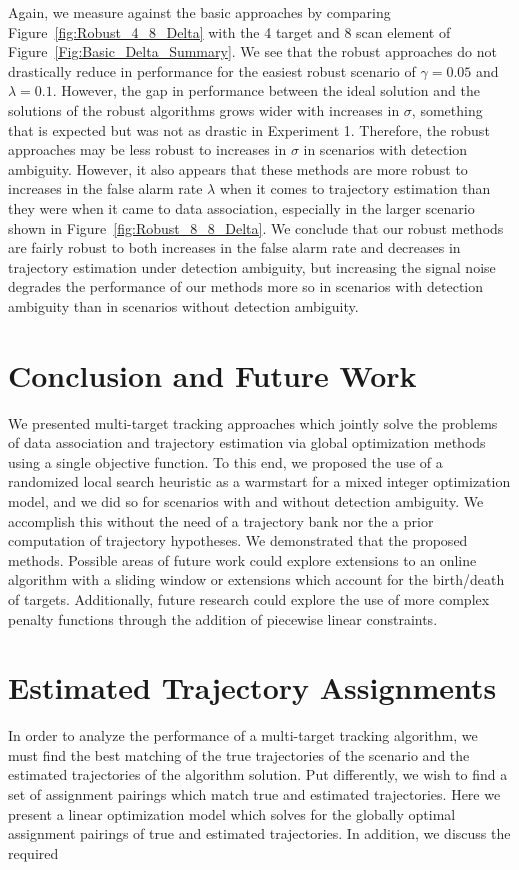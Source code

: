 \documentclass[journal]{IEEEtran}
\begin{document}
Again, we measure against the basic approaches by comparing Figure~\ref{fig:Robust_4_8_Delta} with the 4 target and 8 scan element of Figure~\ref{Fig:Basic_Delta_Summary}. We see that the robust approaches do not drastically reduce in performance for the easiest robust scenario of $\gamma = 0.05$ and $\lambda = 0.1$. However, the gap in performance between the ideal solution and the solutions of the robust algorithms grows wider with increases in $\sigma$, something that is expected but was not as drastic in Experiment 1. Therefore, the robust approaches may be less robust to increases in $\sigma$ in scenarios with detection ambiguity. However, it also appears that these methods are more robust to increases in the false alarm rate $\lambda$ when it comes to trajectory estimation than they were when it came to data association, especially in the larger scenario shown in Figure~\ref{fig:Robust_8_8_Delta}. We conclude that our robust methods are fairly robust to both increases in the false alarm rate and decreases in trajectory estimation under detection ambiguity, but increasing the signal noise degrades the performance of our methods more so in scenarios with detection ambiguity than in scenarios without detection ambiguity.

\section{Conclusion and Future Work}\label{sec:Conclusion}
We presented multi-target tracking approaches which jointly solve the problems of data association and trajectory estimation via global optimization methods using a single objective function. To this end, we proposed the use of a randomized local search heuristic as a warmstart for a mixed integer optimization model, and we did so for scenarios with and without detection ambiguity. We accomplish this without the need of a trajectory bank nor the a prior computation of trajectory hypotheses. We demonstrated that the proposed methods. Possible areas of future work could explore extensions to an online algorithm with a sliding window or extensions which account for the birth/death of targets. Additionally, future research could explore the use of more complex penalty functions through the addition of piecewise linear constraints. 

\appendices
\section{Estimated Trajectory Assignments}\label{sec:Assignment_Appendix}
In order to analyze the performance of a multi-target tracking algorithm, we must find the best matching of the true trajectories of the scenario and the estimated trajectories of the algorithm solution. Put differently, we wish to find a set of assignment pairings which match true and estimated trajectories. Here we present a linear optimization model which solves for the globally optimal assignment pairings of true and estimated trajectories. In addition, we discuss the required 
\end{document}

